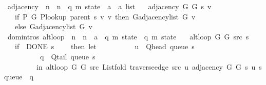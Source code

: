 \begin{isabellebody}
\isanewline
{}\isamarkupfalse%
\ adjacency\ {\isacharcolon}{\kern0pt}{\isacharcolon}{\kern0pt}\ {\isachardoublequoteopen}{\isacharprime}{\kern0pt}n\ {\isasymRightarrow}\ {\isacharprime}{\kern0pt}n\ {\isasymRightarrow}\ {\isacharparenleft}{\kern0pt}{\isacharprime}{\kern0pt}q{\isacharcomma}{\kern0pt}\ {\isacharprime}{\kern0pt}m{\isacharparenright}{\kern0pt}\ state\ {\isasymRightarrow}\ {\isacharprime}{\kern0pt}a\ {\isasymRightarrow}\ {\isacharprime}{\kern0pt}a\ list{\isachardoublequoteclose}\ \isanewline
\ \ {\isachardoublequoteopen}adjacency\ G{}\ G{}\ s\ v\ {\isasymequiv}\isanewline
\ \ \ if\ P{\isacharprime}{\kern0pt}\ G{}\ {\isacharparenleft}{\kern0pt}P{\isacharunderscore}{\kern0pt}lookup\ {\isacharparenleft}{\kern0pt}parent\ s{\isacharparenright}{\kern0pt}\ v{\isacharparenright}{\kern0pt}\ v\ then\ G{\isachardot}{\kern0pt}adjacency{\isacharunderscore}{\kern0pt}list\ G{}\ v\isanewline
\ \ \ else\ G{\isachardot}{\kern0pt}adjacency{\isacharunderscore}{\kern0pt}list\ G{}\ v{\isachardoublequoteclose}\isanewline
\isanewline
{}\isamarkupfalse%
\ {\isacharparenleft}{\kern0pt}domintros{\isacharparenright}{\kern0pt}\ alt{\isacharunderscore}{\kern0pt}loop\ {\isacharcolon}{\kern0pt}{\isacharcolon}{\kern0pt}\ {\isachardoublequoteopen}{\isacharprime}{\kern0pt}n\ {\isasymRightarrow}\ {\isacharprime}{\kern0pt}n\ {\isasymRightarrow}\ {\isacharprime}{\kern0pt}a\ {\isasymRightarrow}\ {\isacharparenleft}{\kern0pt}{\isacharprime}{\kern0pt}q{\isacharcomma}{\kern0pt}\ {\isacharprime}{\kern0pt}m{\isacharparenright}{\kern0pt}\ state\ {\isasymRightarrow}\ {\isacharparenleft}{\kern0pt}{\isacharprime}{\kern0pt}q{\isacharcomma}{\kern0pt}\ {\isacharprime}{\kern0pt}m{\isacharparenright}{\kern0pt}\ state{\isachardoublequoteclose}\ \isanewline
\ \ {\isachardoublequoteopen}alt{\isacharunderscore}{\kern0pt}loop\ G{}\ G{}\ src\ s\ {\isacharequal}{\kern0pt}\isanewline
\ \ \ {\isacharparenleft}{\kern0pt}if\ {\isasymnot}\ DONE\ s\isanewline
\ \ \ \ then\ let\isanewline
\ \ \ \ \ \ \ \ \ \ u\ {\isacharequal}{\kern0pt}\ Q{\isacharunderscore}{\kern0pt}head\ {\isacharparenleft}{\kern0pt}queue\ s{\isacharparenright}{\kern0pt}{\isacharsemicolon}{\kern0pt}\isanewline
\ \ \ \ \ \ \ \ \ \ q\ {\isacharequal}{\kern0pt}\ Q{\isacharunderscore}{\kern0pt}tail\ {\isacharparenleft}{\kern0pt}queue\ s{\isacharparenright}{\kern0pt}\isanewline
\ \ \ \ \ \ \ \ \ in\ alt{\isacharunderscore}{\kern0pt}loop\ G{}\ G{}\ src\ {\isacharparenleft}{\kern0pt}List{\isachardot}{\kern0pt}fold\ {\isacharparenleft}{\kern0pt}traverse{\isacharunderscore}{\kern0pt}edge\ src\ u{\isacharparenright}{\kern0pt}\ {\isacharparenleft}{\kern0pt}adjacency\ G{}\ G{}\ s\ u{\isacharparenright}{\kern0pt}\ {\isacharparenleft}{\kern0pt}s{\isasymlparr}queue\ {\isacharcolon}{\kern0pt}{\isacharequal}{\kern0pt}\ q{\isasymrparr}{\isacharparenright}{\kern0pt}{\isacharparenright}{\kern0pt}\isanewline

\end{isabellebody}
